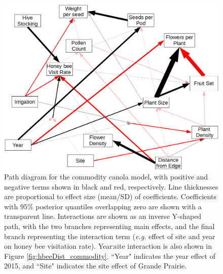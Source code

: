 \begin{figure}
	\includegraphics[width=\textwidth,keepaspectratio=true]{commodity_sem.png}
    \caption[Path diagram for commodity canola model]{Path diagram for the commodity canola model, with positive and negative terms shown in black and red, respectively. Line thicknesses are proportional to effect size (mean/SD) of coefficients. Coefficients with 95\% posterior quantiles overlapping zero are shown with a transparent line. Interactions are shown as an inverse Y-shaped path, with the two branches representing main effects, and the final branch representing the interaction term (\textit{e.g.} effect of site and year on honey bee visitation rate). Year:site interaction is also shown in Figure \ref{fig:hbeeDist_commodity}. ``Year" indicates the year effect of 2015, and ``Site" indicates the site effect of Grande Prairie.}
    \label{fig:commoditySEM}
\end{figure}


